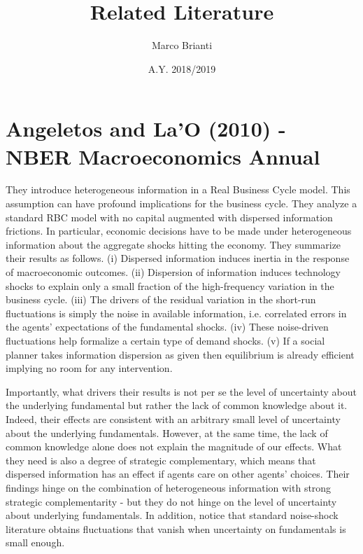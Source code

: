 \documentclass{article}
\title{Related Literature}
\author{Marco Brianti}
\date{A.Y. 2018/2019}
\begin{document}
	\large{

\maketitle

\section*{Angeletos and La'O (2010) - NBER Macroeconomics Annual}

They introduce heterogeneous information in a Real Business Cycle model. This assumption can have profound implications for the business cycle. They analyze a standard RBC model with no capital augmented with dispersed information frictions. In particular, economic decisions have to be made under heterogeneous information about the aggregate shocks hitting the economy. They summarize their results as follows. (i) Dispersed information induces inertia in the response of macroeconomic outcomes. (ii) Dispersion of information induces technology shocks to explain only a small fraction of the high-frequency variation in the business cycle. (iii) The drivers of the residual variation in the short-run fluctuations is simply the noise in available information, i.e. correlated errors in the agents' expectations of the fundamental shocks. (iv) These noise-driven fluctuations help formalize a certain type of demand shocks. (v) If a social planner takes information dispersion as given then equilibrium is already efficient implying no room for any intervention.

Importantly, what drivers their results is not per se the level of uncertainty about the underlying fundamental but rather the lack of common knowledge about it. Indeed, their effects are consistent with an arbitrary small level of uncertainty about the underlying fundamentals. However, at the same time, the lack of common knowledge alone does not explain the magnitude of our effects. What they need is also a degree of strategic complementary, which means that dispersed information has an effect if agents care on other agents' choices. Their findings hinge on the combination of heterogeneous information with strong strategic complementarity - but they do not hinge on the level of uncertainty about underlying fundamentals. In addition, notice that standard noise-shock literature obtains fluctuations that vanish when uncertainty on fundamentals is small enough.

}
\end{document}
